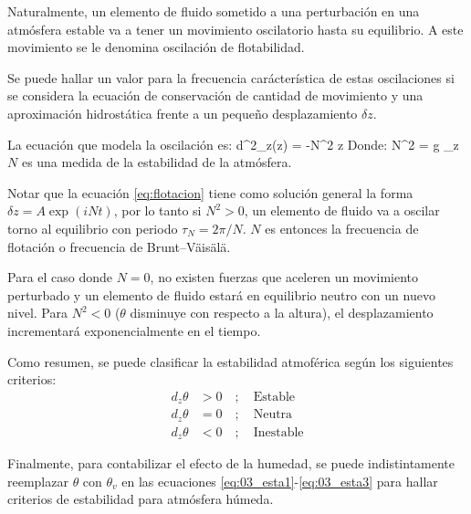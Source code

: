 Naturalmente, un elemento de fluido sometido a una perturbación en una atmósfera estable va a tener un movimiento oscilatorio hasta su equilibrio. A este movimiento se le denomina oscilación de flotabilidad. 

Se puede hallar un valor para la frecuencia carácterística de estas oscilaciones si se considera la ecuación de conservación de cantidad de movimiento y una aproximación hidrostática frente a un pequeño desplazamiento $\delta z$.

La ecuación que modela la oscilación es:
\be \label{eq:flotacion}
d^2_z(\delta z) = -N^2 \delta z
\ee 
Donde:
\be 
N^2 = g \partial_z \ln \theta
\ee
$N$ es una medida de la estabilidad de la atmósfera.

Notar que la ecuación \ref{eq:flotacion} tiene como solución general la forma $\delta z = A \exp(iNt)$, por lo tanto si $N^2>0$, un elemento de fluido va a oscilar torno al equilibrio con periodo $\tau_N = 2\pi/N$. $N$ es entonces la frecuencia de flotación o frecuencia de Brunt–Väisälä. 

Para el caso donde $N=0$, no existen fuerzas que aceleren un movimiento perturbado y un elemento de fluido estará en equilibrio neutro con un nuevo nivel. Para $N^2<0$ ($\theta$ disminuye con respecto a la altura), el desplazamiento incrementará exponencialmente en el tiempo.

Como resumen, se puede clasificar la estabilidad atmoférica según los siguientes criterios:
\begin{align}
d_z \theta &> 0\quad;\quad\text{Estable}\label{eq:03_esta1}\\
d_z \theta &= 0\quad;\quad\text{Neutra} \label{eq:03_esta2}\\
d_z \theta &< 0\quad;\quad\text{Inestable} \label{eq:03_esta3}
\end{align}

Finalmente, para contabilizar el efecto de la humedad, se puede indistintamente reemplazar $\theta$ con $\theta_v$ en las ecuaciones \ref{eq:03_esta1}-\ref{eq:03_esta3} para hallar criterios de estabilidad para atmósfera húmeda.

\newpage
